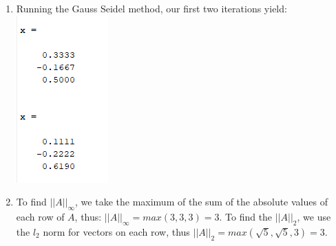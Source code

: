 \documentclass{article}
\begin{document}
\begin{enumerate}
    \item Running the Gauss Seidel method, our first two iterations yield: \\
    \includegraphics{9.png}

    \item To find $||A||_{\infty}$, we take the maximum of the sum of the absolute
    values of each row of $A$, thus: $||A||_{\infty} = max(3, 3, 3) = 3$. To find 
    the $||A||_2$, we use the $l_2$ norm for vectors on each row, thus $||A||_2 = 
    max(\sqrt{5}, \sqrt{5}, 3) = 3$. 

\end{enumerate}
\end{document}
